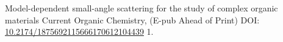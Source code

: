 \begin{cvpubs}
  \cvpub
    {Model-dependent small-angle scattering for the study of complex organic materials}
    {Current Organic Chemistry, (E-pub Ahead of Print) DOI: \href{10.2174/1875692115666170612104439}{10.2174/1875692115666170612104439}}
    {1.}
\end{cvpubs}
